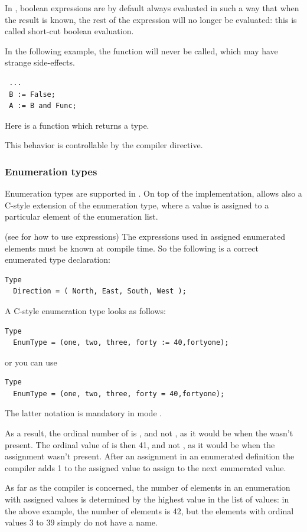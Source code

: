 \begin{remark}
In \fpc, boolean expressions are by default always evaluated in such a
way that when the result is known, the rest of the expression will no longer
be evaluated: this is called short-cut boolean evaluation.

In the following example, the function  will never be called,
which may have strange side-effects.
\begin{verbatim}
 ...
 B := False;
 A := B and Func;
\end{verbatim}
Here  is a function which returns a  type.

This behavior is controllable by the  compiler directive.
\end{remark}

\subsubsection{Enumeration types}
Enumeration types are supported in \fpc. On top of the \tp
implementation, \fpc allows also a C-style extension of the
enumeration type, where a value is assigned to a particular element of
the enumeration list.

(see  for how to use expressions)
The expressions used in assigned enumerated elements must be known at
compile time.
So the following is a correct enumerated type declaration:
\begin{verbatim}
Type
  Direction = ( North, East, South, West );
\end{verbatim}
A C-style enumeration type looks as follows:
\begin{verbatim}
Type
  EnumType = (one, two, three, forty := 40,fortyone);
\end{verbatim}
or you can use
\begin{verbatim}
Type
  EnumType = (one, two, three, forty = 40,fortyone);
\end{verbatim}
The latter notation is mandatory in mode .

As a result, the ordinal number of  is , and not ,
as it would be when the  wasn't present.
The ordinal value of  is then {41}, and not , as it
would be when the assignment wasn't present. After an assignment in an
enumerated definition the compiler adds 1 to the assigned value to assign to
the next enumerated value.

As far as the compiler is concerned, the number of elements in an enumeration 
with assigned values is determined by the highest value in the list of values: 
in the above example, the number of elements is 42, but the elements with ordinal 
values 3 to 39 simply do not have a name.

